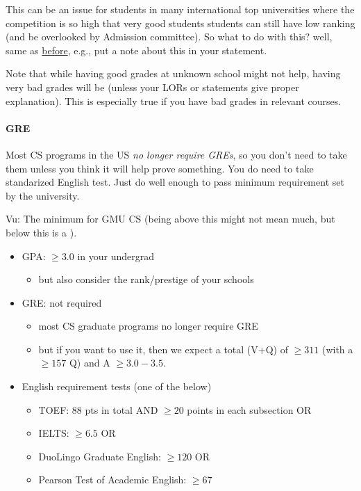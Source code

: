 \documentclass[10pt]{article}
\newcommand{\red}[1]{{\color{red}{#1}}}
\begin{document}
This can be an issue for students in many international top universities 
where the competition is so high that very good students students can still have low ranking (and be overlooked by Admission committee).
So what to do with this? well, same as \hyperref[sec:your-school]{before}, e.g., put a note about this in your statement.

Note that while having good grades at unknown school might not help,
having very bad grades will be \red{red flag} (unless your LORs or
statements give proper explanation). This is especially true if you
have bad grades in relevant courses.

\paragraph{GRE} Most CS programs in the US \emph{no longer require GREs}, so you don't need to
take them unless you think it will help prove something. You do need to
take standarized English test. Just do well enough to pass minimum
requirement set by the university.

\begin{tcolorbox}[left=1pt,right=1pt,top=1pt,bottom=1pt]
Vu: The minimum for GMU CS (being above this might not mean much, but below this is a \red{red flag}).
\begin{itemize}
\item GPA: $\ge 3.0$ in your undergrad
  \begin{itemize}
  \item but also consider the rank/prestige of your schools
  \end{itemize}
\item GRE: not required
  \begin{itemize}  
    \item most CS graduate programs no longer require GRE
    \item but if you want to use it, then we expect a total (V+Q) of $\ge 311$ (with a $\ge 157$ Q) and A $\ge 3.0-3.5$.
  \end{itemize}      
\item English requirement tests (one of the below)
  \begin{itemize}    
  \item TOEF: 88 pts in total AND $\ge 20$ points in each subsection OR
  \item IELTS: $\ge 6.5$ OR
  \item DuoLingo Graduate English: $\ge 120$ OR 
  \item Pearson Test of Academic English: $\ge 67$
  \end{itemize}  
\end{itemize}
\end{tcolorbox}
\end{document}
